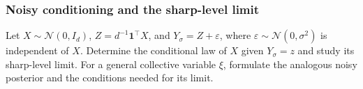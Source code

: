 \documentclass[12pt,a4paper,oneside]{book}
\begin{document}
\subsubsection{Noisy conditioning and the sharp-level limit}
\label{src:p12q2}
\begin{Question}
Let $X\sim\mathcal N(0,I_d)$, $Z=d^{-1}\mathbf1^\top X$, and $Y_\sigma=Z+\varepsilon$, where $\varepsilon\sim\mathcal N(0,\sigma^2)$ is independent of $X$. Determine the conditional law of $X$ given $Y_\sigma=z$ and study its sharp-level limit. For a general collective variable $\xi$, formulate the analogous noisy posterior and the conditions needed for its limit.
\end{Question}
% 
\end{document}
